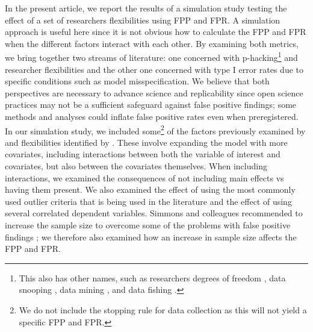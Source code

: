In the present article, we report the results of a simulation study testing the effect of a set of researchers flexibilities using FPP and FPR. A simulation approach is useful here since it is not obvious how to calculate the FPP and FPR when the different factors interact with each other. By examining both metrics, we bring together two streams of literature: one concerned with p-hacking\footnote{This also has other names, such as researchers degrees of freedom \citep{Simmons2011}, data snooping \citep{white2000reality}, data mining \citep{lovell1983}, and data fishing \citep{selvin1966data}.} \citep{simonsohn2014p} and researcher flexibilities and the other one concerned with type I error rates due to specific conditions such as model misspecification. We believe that both perspectives are necessary to advance science and replicability since open science practices may not be a sufficient safeguard against false positive findings; some methods and analyses could inflate false positive rates even when preregistered. In our simulation study, we included some\footnote{We do not include the stopping rule for data collection as this will not yield a specific FPP and FPR.} of the factors previously examined by \cite{Simmons2011} and flexibilities identified by \cite{Wicherts2016}. These involve expanding the model with more covariates, including interactions between both the variable of interest and covariates, but also between the covariates themselves. When including interactions, we examined the consequences of not including main effects vs having them present. We also examined the effect of using the most commonly used outlier criteria that is being used in the literature \citep{Leyes2013} and the effect of using several correlated dependent variables. Simmons and colleagues recommended to increase the sample size to overcome some of the problems with false positive findings \citep{Simmons2011}; we therefore also examined how an increase in sample size affects the FPP and FPR. 

